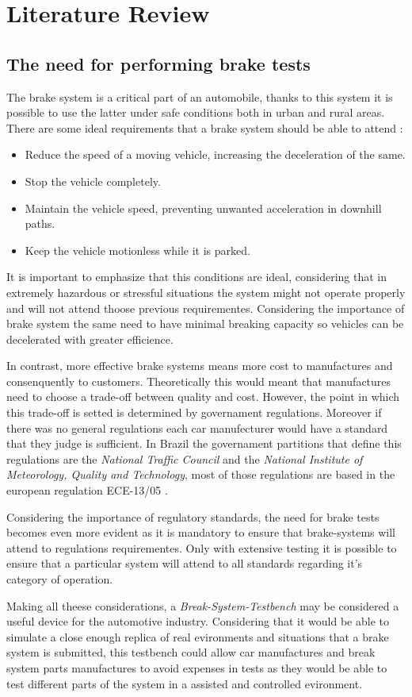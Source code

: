 \chapter{Literature Review}

\section{The need for performing brake tests}
The brake system is a critical part of an automobile, thanks to this system it is possible to use the latter under safe conditions both in urban and rural areas. There are some ideal requirements that a brake system should be able to attend \cite{kawaguchi} :

\begin{itemize}
	\item Reduce the speed of a moving vehicle, increasing the deceleration of the same.
	\item Stop the vehicle completely.
	\item Maintain the vehicle speed, preventing unwanted acceleration in downhill paths.
	\item Keep the vehicle motionless while it is parked.
\end{itemize}

It is important to emphasize that this conditions are ideal, considering that in extremely hazardous or stressful situations the system might not operate properly and will not attend thoose previous requirementes. Considering the importance of brake system the same need to have minimal breaking capacity so vehicles can be decelerated with greater efficience. 
\par
In contrast, more effective brake systems means more cost to manufactures and consenquently to customers. Theoretically this would meant that manufactures need to choose a trade-off between quality and cost. However, the point in which this trade-off is setted is determined by governament regulations. Moreover if there was no general regulations each car manufecturer would have a standard that they judge is sufficient. In Brazil the governament partitions that define this regulations are the \textit{National Traffic Council} and the \textit{National Institute of Meteorology, Quality and Technology}, most of those regulations are based in the european regulation ECE-13/05 \cite{inmetro2013} .
\par
Considering the importance of regulatory standards, the need for brake tests becomes even more evident as it is mandatory to ensure that brake-systems will attend to regulations requirementes. Only with extensive testing it is possible to ensure that a particular system will attend to all standards regarding it's category of operation. 
\par
Making all theese considerations, a \textit{Break-System-Testbench} may be considered a useful device for the automotive industry. Considering that it would be able to simulate a close enough replica of real evironments and situations that a brake system is submitted, this testbench could allow car manufactures and break system parts manufactures to avoid expenses in tests as they would be able to test different parts of the system in a assisted and controlled evironment.


